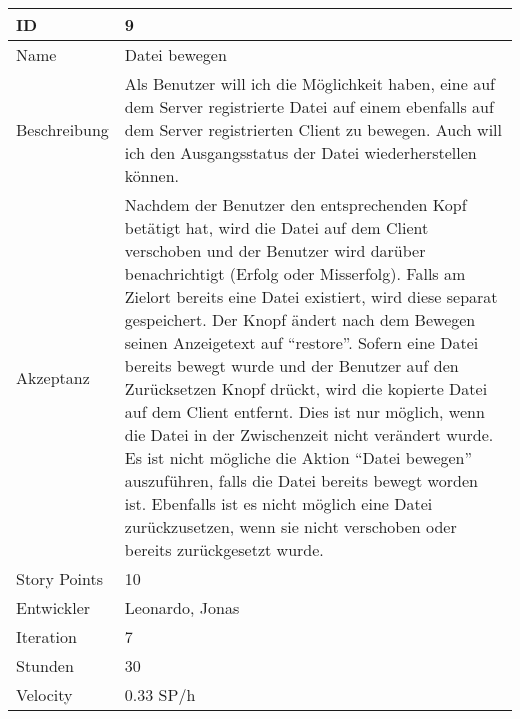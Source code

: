 \begin{table}[htbp]
    \begin{minipage}{\linewidth}
        \setlength{\tymax}{0.5\linewidth}
        \centering
        \small
        \begin{tabulary}{\textwidth}{|l|p{10cm}|} \hline
            ID   &9\\\hline
            Name  &Datei bewegen\\\hline
	    Beschreibung&Als Benutzer will ich die Möglichkeit haben, eine auf dem Server registrierte Datei auf einem ebenfalls auf dem Server registrierten Client zu bewegen. 
	    Auch will ich den Ausgangsstatus der Datei wiederherstellen können.\\\hline
	    Akzeptanz &Nachdem der Benutzer den entsprechenden Kopf betätigt hat, wird die Datei auf dem Client verschoben und der Benutzer wird darüber benachrichtigt (Erfolg oder Misserfolg). Falls am Zielort bereits eine Datei existiert, wird diese separat gespeichert. Der Knopf ändert nach dem Bewegen seinen Anzeigetext auf "`restore"'. Sofern eine Datei bereits bewegt wurde und der Benutzer auf den Zurücksetzen Knopf drückt, wird die kopierte Datei auf dem Client entfernt. Dies ist nur möglich, wenn die Datei in der Zwischenzeit nicht verändert wurde. Es ist nicht mögliche die Aktion "`Datei bewegen"' auszuführen, falls die Datei bereits bewegt worden ist. Ebenfalls ist es nicht möglich eine Datei zurückzusetzen, wenn sie nicht verschoben oder bereits zurückgesetzt wurde.\\\hline
            Story Points&10\\\hline
            Entwickler &Leonardo, Jonas\\\hline
            Iteration &7\\\hline
            Stunden  &30\\\hline
            Velocity &0.33 SP\slash h\\\hline
        \end{tabulary}
    \end{minipage}
\end{table}



